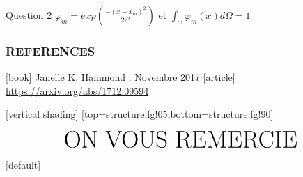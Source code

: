 \documentclass[a4paper,10pt]{beamer}
\numberwithin{equation}{section}
\begin{document}
\begin{frame}
\begin{block}{\sc Question 2}
	$
	\varphi_m = exp\left( \frac{-(x - x_m)^2}{2r^2} \right) \mbox{ et } \int_{\omega} \varphi_m(x) d \Omega =1$
\end{block}
\end{frame}

\begin{frame}
\frametitle{REFERENCES}
\begin{thebibliography}{10}    
	[book]
	Janelle K. Hammond
	.
	 Novembre 2017
	[article]
	\href{https://arxiv.org/abs/1712.09594}{https://arxiv.org/abs/1712.09594} 
\end{thebibliography}
\end{frame}
[vertical shading]
[top=structure.fg!05,bottom=structure.fg!90]
\begin{frame}
$$\mbox{\Huge ON VOUS REMERCIE} $$
\end{frame}
[default]
\end{document}
